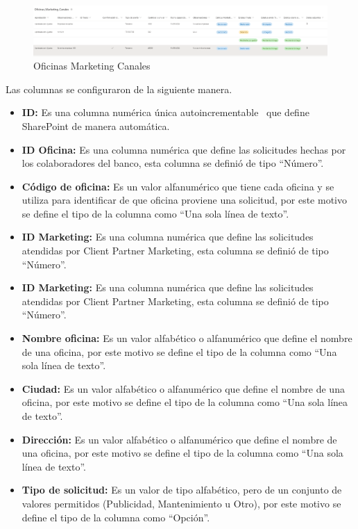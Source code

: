\begin{figure}[H]
	\centering
	\includegraphics[scale=0.37]{Capitulo4/imagenes/13.png}
	\caption{Oficinas Marketing Canales}
	\label{OMC2}
\end{figure}

Las columnas se configuraron de la siguiente manera.

\begin{itemize}
	\item \textbf{ID: }Es una columna numérica única autoincrementable  que define SharePoint de manera automática.
	\item \textbf{ID Oficina: }Es una columna numérica que define las solicitudes hechas por los colaboradores del banco, esta columna se definió de tipo ``Número''.
	\item \textbf{Código de oficina: }Es un valor alfanumérico que tiene cada oficina y se utiliza para identificar de que oficina proviene una solicitud, por este motivo se define el tipo de la columna como ``Una sola línea de texto''.
	\item \textbf{ID Marketing: }Es una columna numérica que define las solicitudes atendidas por Client Partner Marketing, esta columna se definió de tipo ``Número''.
	\item \textbf{ID Marketing: }Es una columna numérica que define las solicitudes atendidas por Client Partner Marketing, esta columna se definió de tipo ``Número''.
	\item \textbf{Nombre oficina: }Es un valor alfabético o alfanumérico que define el nombre de una oficina, por este motivo se define el tipo de la columna como ``Una sola línea de texto''.
	\item \textbf{Ciudad: } Es un valor alfabético o alfanumérico que define el nombre de una oficina, por este motivo se define el tipo de la columna como ``Una sola línea de texto''.
	\item \textbf{Dirección: } Es un valor alfabético o alfanumérico que define el nombre de una oficina, por este motivo se define el tipo de la columna como ``Una sola línea de texto''.
	\item \textbf{Tipo de solicitud: } Es un valor de tipo alfabético, pero de un conjunto de valores permitidos (Publicidad, Mantenimiento u Otro), por este motivo se define el tipo de la columna como ``Opción''.

\end{itemize}
